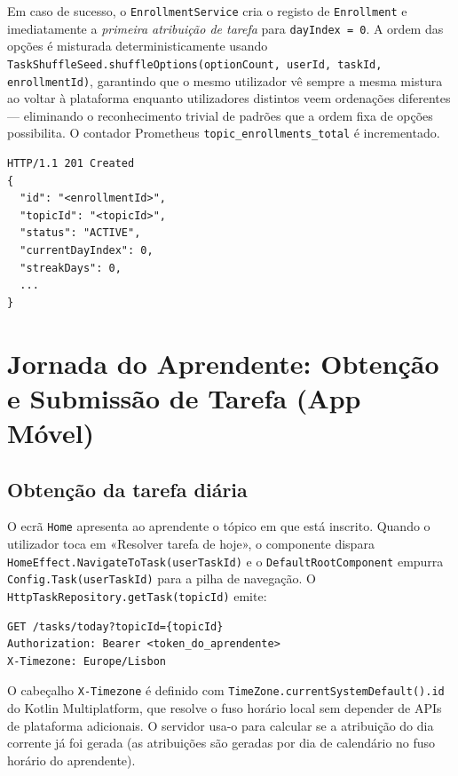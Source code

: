 Em caso de sucesso, o \texttt{EnrollmentService} cria o registo de
\texttt{Enrollment} e imediatamente a \emph{primeira atribuição de tarefa}
para \texttt{dayIndex = 0}.
A ordem das opções é misturada deterministicamente usando
\texttt{TaskShuffleSeed.shuffleOptions(optionCount, userId, taskId,
enrollmentId)}, garantindo que o mesmo utilizador vê sempre a mesma
mistura ao voltar à plataforma enquanto utilizadores distintos veem
ordenações diferentes — eliminando o reconhecimento trivial de padrões
que a ordem fixa de opções possibilita.
O contador Prometheus \texttt{topic\_enrollments\_total} é incrementado.

\begin{verbatim}
HTTP/1.1 201 Created
{
  "id": "<enrollmentId>",
  "topicId": "<topicId>",
  "status": "ACTIVE",
  "currentDayIndex": 0,
  "streakDays": 0,
  ...
}
\end{verbatim}

\section{Jornada do Aprendente: Obtenção e Submissão de Tarefa (App Móvel)}
\label{sec:submissao_dificuldade}

\subsection*{Obtenção da tarefa diária}

O ecrã \texttt{Home} apresenta ao aprendente o tópico em que está inscrito.
Quando o utilizador toca em «Resolver tarefa de hoje», o componente dispara
\texttt{HomeEffect.NavigateToTask(userTaskId)} e o
\texttt{DefaultRootComponent} empurra \texttt{Config.Task(userTaskId)}
para a pilha de navegação.
O \texttt{HttpTaskRepository.getTask(topicId)} emite:

\begin{verbatim}
GET /tasks/today?topicId={topicId}
Authorization: Bearer <token_do_aprendente>
X-Timezone: Europe/Lisbon
\end{verbatim}

O cabeçalho \texttt{X-Timezone} é definido com
\texttt{TimeZone.currentSystemDefault().id} do Kotlin Multiplatform, que
resolve o fuso horário local sem depender de APIs de plataforma adicionais.
O servidor usa-o para calcular se a atribuição do dia corrente já foi
gerada (as atribuições são geradas por dia de calendário no fuso horário
do aprendente).

